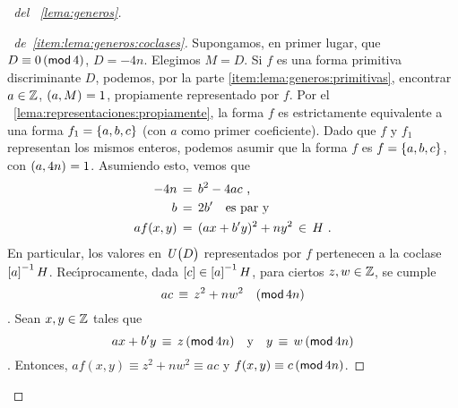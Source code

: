 \begin{proof}[\proofname~del \lemaname~\ref{lema:generos}]
	\begin{proof}[\proofname~de~\ref{item:lema:generos:coclases}]
		Supongamos, en primer lugar, que $D\equiv 0\tmodulo[4]$,
		$D=-4n$. Elegimos $M=D$. Si $f$ es una forma
		primitiva discriminante $D$, podemos, por la parte
		\ref{item:lema:generos:primitivas}, encontrar $a\in\Enteros$,
		$\mcd{a,M}=1$, propiamente representado por $f$.
		Por el \lemaname~\ref{lema:representaciones:propiamente},
		la forma $f$ es estrictamente equivalente a una forma
		$f_1=\binaria{a,b,c}$ (con $a$ como primer coeficiente).
		Dado que $f$ y $f_1$ representan los mismos enteros,
		podemos asumir que la forma $f$ es $f=\binaria{a,b,c}$,
		con $\mcd{a,4n}=1$. Asumiendo esto, vemos que
		\begin{displaymath}
			\begin{aligned}
				-4n & \,=\,b^2-4ac \dispcomma \\
				b & \,=\,2b' \quad\text{es par y} \\
				af(x,y) & \,=\,(ax+b'y)^2+ny^2
				\,\in\,H
				\dispstop
			\end{aligned}
		\end{displaymath}
		En particular, los valores en $\Unidadesmod[D]$ representados
		por $f$ pertenecen a la coclase $\clase a^{-1}H$.
		Rec\'{\i}procamente, dada $\clase c\in\clase a^{-1}H$,
		para ciertos $z,w\in\Enteros$, se cumple
		\begin{displaymath}
			ac\,\equiv\,z^2+nw^2\modulo[4n]
		\end{displaymath}
		\quedacomoejercicio.
		Sean $x,y\in\Enteros$ tales que
		\begin{displaymath}
			ax+b'y\,\equiv\,z\tmodulo[4n]
			\dispand
			y\,\equiv\,w\tmodulo[4n]
		\end{displaymath}
		\quedacomoejercicio.
		Entonces, $af(x,y)\equiv z^2+nw^2\equiv ac$ y
		$f(x,y)\equiv c\tmodulo[4n]$.


\end{proof}
\end{proof}
